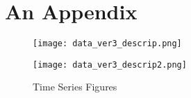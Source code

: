 \chapter{An Appendix}

\begin{figure}
\caption{Time Series Figures}
\centering
\texttt{[image: data\_ver3\_descrip.png]}

\texttt{[image: data\_ver3\_descrip2.png]}

\label{fig:my_label}
\end{figure}